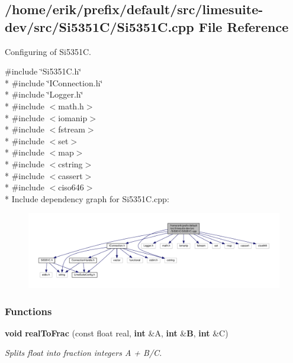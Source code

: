 \subsection{/home/erik/prefix/default/src/limesuite-\/dev/src/\+Si5351\+C/\+Si5351C.cpp File Reference}
\label{Si5351C_8cpp}


Configuring of Si5351C.  


{\ttfamily \#include \char`\"{}Si5351\+C.\+h\char`\"{}}\\*
{\ttfamily \#include \char`\"{}I\+Connection.\+h\char`\"{}}\\*
{\ttfamily \#include \char`\"{}Logger.\+h\char`\"{}}\\*
{\ttfamily \#include $<$math.\+h$>$}\\*
{\ttfamily \#include $<$iomanip$>$}\\*
{\ttfamily \#include $<$fstream$>$}\\*
{\ttfamily \#include $<$set$>$}\\*
{\ttfamily \#include $<$map$>$}\\*
{\ttfamily \#include $<$cstring$>$}\\*
{\ttfamily \#include $<$cassert$>$}\\*
{\ttfamily \#include $<$ciso646$>$}\\*
Include dependency graph for Si5351\+C.\+cpp\+:
\nopagebreak
\begin{figure}[H]
\begin{center}
\leavevmode
\includegraphics[width=350pt]{d5/d90/Si5351C_8cpp__incl}
\end{center}
\end{figure}
\subsubsection*{Functions}
\begin{DoxyCompactItemize}
\item 
{\bf void} {\bf real\+To\+Frac} (const float real, {\bf int} \&A, {\bf int} \&{\bf B}, {\bf int} \&C)
\begin{DoxyCompactList}\small\item\em Splits float into fraction integers A + B/C. \end{DoxyCompactList}\end{DoxyCompactItemize}


